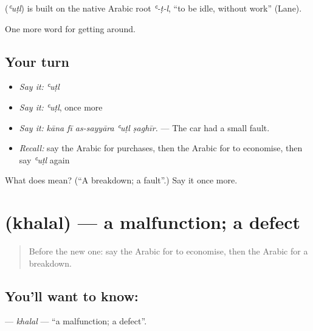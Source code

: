 \begin{cousinweb}
\textbf{} (\emph{ʿuṭl}) is built on the native Arabic root \emph{ʿ-ṭ-l}, \textquotedblleft{}to be idle, without work\textquotedblright{} (Lane).
\end{cousinweb}

\begin{grammarlens}[title={What you've built}]
One more word for getting around.
\end{grammarlens}

\subsection*{Your turn}
\begin{itemize}
\raggedright
  \item \emph{Say it:} \emph{ʿuṭl}
  \item \emph{Say it:} \emph{ʿuṭl}, once more
  \item \emph{Say it:} \emph{kāna fī as-sayyāra ʿuṭl ṣaghīr.} — The car had a small fault.
  \item \emph{Recall:} say the Arabic for purchases, then the Arabic for to economise, then say \emph{ʿuṭl} again
\end{itemize}

\begin{tcolorbox}[breakable,colback=teal!4,colframe=teal!35!black,title={Before you move on}]
What does  mean? (\textquotedblleft{}A breakdown; a fault\textquotedblright{}.) Say it once more.
\end{tcolorbox}
\section[\texorpdfstring{\ar{خلل} (khalal)}{خلل (khalal)}]{ (khalal) — a malfunction; a defect}

\label{lesson:AR-C460-khalal}



\begin{quote}
Before the new one: say the Arabic for to economise, then the Arabic for a breakdown.
\end{quote}

\subsection*{You'll want to know: }
\textbf{} — \emph{khalal} — \textquotedblleft{}a malfunction; a defect\textquotedblright{}.

